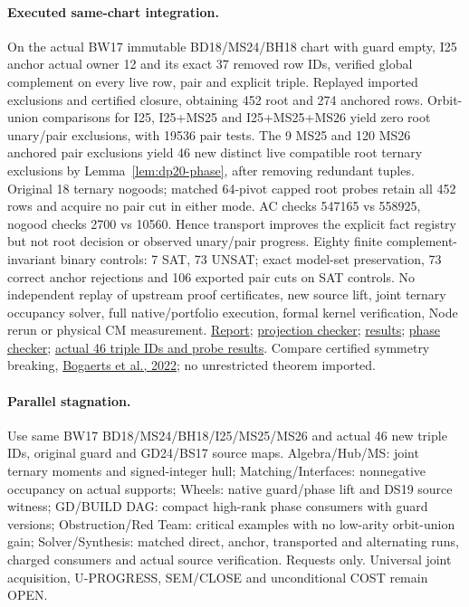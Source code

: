 \documentclass[11pt]{article}
\begin{document}
\paragraph{Executed same-chart integration.}
On the actual BW17 immutable BD18/MS24/BH18 chart with guard empty, I25 anchor actual owner 12 and its exact 37 removed row IDs, verified global complement on every live row, pair and explicit triple. Replayed imported exclusions and certified closure, obtaining 452 root and 274 anchored rows. Orbit-union comparisons for I25, I25+MS25 and I25+MS25+MS26 yield zero root unary/pair exclusions, with 19536 pair tests. The 9 MS25 and 120 MS26 anchored pair exclusions yield 46 new distinct live compatible root ternary exclusions by Lemma~\ref{lem:dp20-phase}, after removing redundant tuples. Original 18 ternary nogoods; matched 64-pivot capped root probes retain all 452 rows and acquire no pair cut in either mode. AC checks 547165 vs 558925, nogood checks 2700 vs 10560. Hence transport improves the explicit fact registry but not root decision or observed unary/pair progress. Eighty finite complement-invariant binary controls: 7 SAT, 73 UNSAT; exact model-set preservation, 73 correct anchor rejections and 106 exported pair cuts on SAT controls. No independent replay of upstream proof certificates, new source lift, joint ternary occupancy solver, full native/portfolio execution, formal kernel verification, Node rerun or physical CM measurement.
\href{https://github.com/j15marti/pnp/commit/46f35d876d2b26f301108029d1626ea523677357}{Report}; \href{https://github.com/j15marti/pnp/commit/164365ae505fc6287e6db9ae1e3be80719b9fc33}{projection checker}; \href{https://github.com/j15marti/pnp/commit/923a08c48e92064453c8da5a024ec76c62484f58}{results}; \href{https://github.com/j15marti/pnp/commit/1f35f3a58c6ef262d9d05da00ba733c652e7cb79}{phase checker}; \href{https://github.com/j15marti/pnp/commit/544a501297a6c3349af01fa44e49e37169bd0eda}{actual 46 triple IDs and probe results}. Compare certified symmetry breaking, \href{https://arxiv.org/abs/2203.12275}{Bogaerts et al., 2022}; no unrestricted theorem imported.
\paragraph{Parallel stagnation.}
Use same BW17 BD18/MS24/BH18/I25/MS25/MS26 and actual 46 new triple IDs, original guard and GD24/BS17 source maps. Algebra/Hub/MS: joint ternary moments and signed-integer hull; Matching/Interfaces: nonnegative occupancy on actual supports; Wheels: native guard/phase lift and DS19 source witness; GD/BUILD DAG: compact high-rank phase consumers with guard versions; Obstruction/Red Team: critical examples with no low-arity orbit-union gain; Solver/Synthesis: matched direct, anchor, transported and alternating runs, charged consumers and actual source verification. Requests only. Universal joint acquisition, U-PROGRESS, SEM/CLOSE and unconditional COST remain OPEN.
\end{document}
